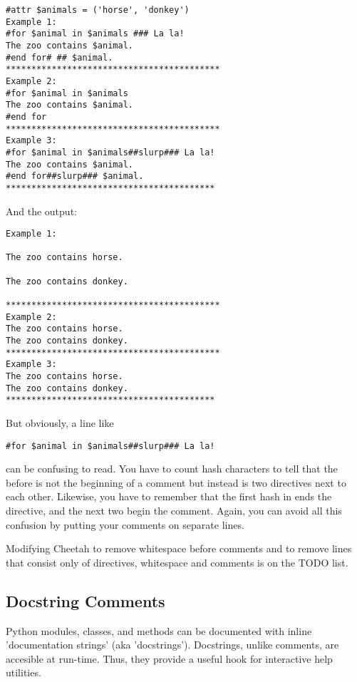 \begin{verbatim}
#attr $animals = ('horse', 'donkey')
Example 1:
#for $animal in $animals ### La la!
The zoo contains $animal.
#end for# ## $animal.
******************************************
Example 2:
#for $animal in $animals
The zoo contains $animal.
#end for
******************************************
Example 3:
#for $animal in $animals##slurp### La la!
The zoo contains $animal.
#end for##slurp### $animal.
*****************************************
\end{verbatim}

And the output:

\begin{verbatim}
Example 1:

The zoo contains horse.

The zoo contains donkey.
 
******************************************
Example 2:
The zoo contains horse.
The zoo contains donkey.
******************************************
Example 3:
The zoo contains horse.
The zoo contains donkey.
*****************************************

\end{verbatim}

But obviously, a line like
\begin{verbatim}
#for $animal in $animals##slurp### La la!
\end{verbatim}
can be confusing to read.  You have to count hash characters to tell that the
\code{\#\#} before  is not the beginning of a comment but instead
is two directives next to each other.  Likewise, you have to remember
that the first hash in \code{\#\#\#} ends the  directive, and the
next two begin the comment.  Again, you can avoid all this confusion by putting
your comments on separate lines.

Modifying Cheetah to remove whitespace before comments and to remove lines
that consist only of directives, whitespace and comments is on the TODO list.

\subsection{Docstring Comments}
\label{comments.docstring}

Python modules, classes, and methods can be documented with inline
'documentation strings' (aka 'docstrings').  Docstrings, unlike comments, are
accesible at run-time. Thus, they provide a useful hook for interactive help
utilities.  

